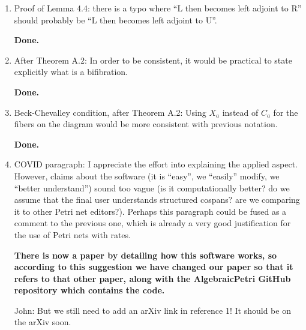 \documentclass[reqno]{amsart}
\def\chris{\color{purple} Christina: }
\def\john{\color{red} John: }
\begin{document}
\begin{enumerate}
{\john  Okay, that makes sense.   I put the paragraph back in and changed it a bunch: basically, I added some more steps so people who don't know what 
we're doing will have an easier time figuring it out.   Does it look okay to you?}

{\chris Yes it does, thanks! Although in my mind, it kinda goes the opposite way: e.g. the already induced monoidal product on the fibers ends up 
having the universal property of a coproduct for example. Possibly just overthinking and getting mixed up with words.}

{\john I changed the paragraph, trying to solve the problem Christina just mentioned.}

{\chris Looks good!}
\fi

\item Proof of Lemma 4.4: there is a typo where “L then becomes left adjoint to R” should probably be “L then becomes left adjoint to U”.

{\bf Done.}  

 

\item After Theorem A.2: In order to be consistent, it would be practical to state explicitly what is a bifibration.

{\bf Done.} 

 

\item Beck-Chevalley condition, after Theorem A.2: Using $X_a$ instead of $C_a$ for the fibers on the diagram would be more consistent with previous 
notation.

{\bf Done.} 

 

\item COVID paragraph: I appreciate the effort into explaining the applied aspect. However, claims about the software (it is ``easy'', we ``easily'' modify, we ``better understand'') sound too vague (is it computationally better? do we assume that the final user understands structured cospans? are we comparing  it to other Petri net editors?). Perhaps this paragraph could be fused as a comment to the previous one, which is already a very good justification  for the use of Petri nets with rates.

{\bf There is now a paper by detailing how this software works, so according to this suggestion we have changed our paper so that it  refers to that other paper, along with the AlgebraicPetri GitHub repository which contains the code.} 

\iffalse
  {\john But we still need to add an arXiv link in reference 1!  It should be on the arXiv soon.} 


\end{enumerate}
\end{document}
